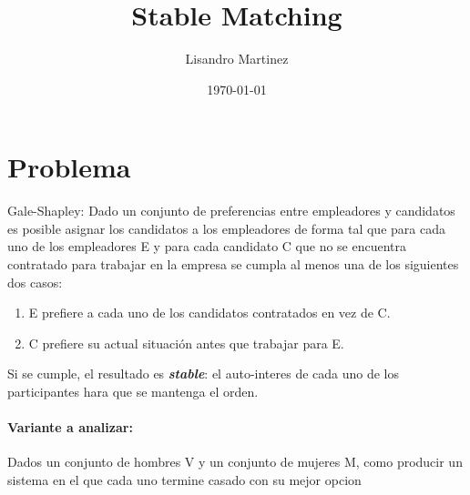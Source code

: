 \documentclass[12pt, fleqn]{article}
\title{Stable Matching}
\author{Lisandro Martinez}
\date{\today}
\theoremstyle{remark}
\theoremstyle{definition}
\begin{document}
\maketitle{}
\section{Problema}
    Gale-Shapley: Dado un conjunto de preferencias entre empleadores y candidatos
    es posible asignar los candidatos a los empleadores de forma tal que para
    cada uno de los empleadores E y para cada candidato C que no se encuentra 
    contratado para trabajar en la empresa
    se cumpla al menos una de los siguientes dos casos:
\begin{enumerate}
    \item E prefiere a cada uno de los candidatos contratados en vez de C.
    \item C prefiere su actual situación antes que trabajar para E.
\end{enumerate}
    Si se cumple, el resultado es \textbf{\emph{stable}}: 
    el auto-interes de cada uno de los participantes hara que se mantenga el orden.
\paragraph{Variante a analizar:}
    Dados un conjunto de hombres V y un conjunto de mujeres M, como producir un sistema 
    en el que cada uno termine casado con su mejor opcion
\end{document}
